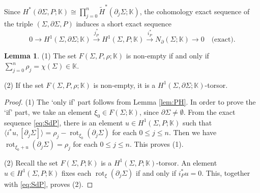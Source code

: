 \documentclass[a4paper,12pt, twoside]{amsart}
\theoremstyle{definition}
\newtheorem{lem}[dfn]{Lemma}
\theoremstyle{remark}
\numberwithin{equation}{section}
\newcommand\bK{{\mathbb{K}}}
\newcommand\pa{\partial}
\newcommand\rot{\operatorname{rot}}
\begin{document}
\par
Since $H^*(\pa\Sigma, P; \bK) \cong \prod^n_{j=0}\widetilde{H}^*(\pa_j\Sigma; \bK)$, 
the cohomology exact sequence of the triple $(\Sigma, \pa\Sigma, P)$ induces a short exact sequence
\begin{equation}\label{eq:SdP}
0 \to H^1(\Sigma, \pa\Sigma; \bK) \overset{j^*_P}\to H^1(\Sigma, P; \bK) \overset{i^*_P}\to N_\pa(\Sigma; \bK) \to 0\quad \text{(exact)}.
\end{equation}
\begin{lem}\label{lem:nonempty}
(1) The set $F(\Sigma, P, \rho; \bK)$ is non-empty if and only if $\sum^n_{j=0}\rho_j = \chi(\Sigma) \in \bK$.\par
(2) If the set $F(\Sigma, P, \rho; \bK)$ is non-empty, it is a $H^1(\Sigma, \pa\Sigma; \bK)$-torsor.
\end{lem}
\begin{proof}
(1) The `only if' part follows from Lemma \ref{lem:PH}. 
In order to prove the `if' part, we take an element $\xi_0 \in F(\Sigma; \bK)$, 
since $\pa\Sigma \neq \emptyset$. 
From the exact sequence \eqref{eq:SdP}, 
there is an element $u \in H^1(\Sigma, P; \bK) $ such that $\langle i^*u, [\pa_j\Sigma]\rangle = \rho_j - \rot_{\xi_0}(\pa_j\Sigma)$ for each $0\leq j \leq n$. 
Then we have $\rot_{\xi_0+u}(\pa_j\Sigma) = \rho_j$ for each $0\leq j \leq n$.
This proves (1).\par
(2) Recall the set $F(\Sigma, P; \bK)$ is a $H^1(\Sigma, P; \bK)$-torsor. An element $u \in H^1(\Sigma, P; \bK)$ fixes each $\rot_\xi(\pa_j\Sigma)$ if and only if $i^*_Pu = 0$. This, together with \eqref{eq:SdP}, proves (2).
\end{proof}
\end{document}
